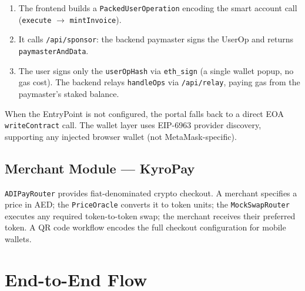 \documentclass[11pt,a4paper]{article}
\begin{document}
\begin{enumerate}[leftmargin=2em, topsep=2pt, itemsep=1pt]
  \item The frontend builds a \texttt{PackedUserOperation} encoding the smart account
    call (\texttt{execute} $\to$ \texttt{mintInvoice}).
  \item It calls \texttt{/api/sponsor}: the backend paymaster signs the UserOp and
    returns \texttt{paymasterAndData}.
  \item The user signs only the \texttt{userOpHash} via \texttt{eth\_sign} (a single
    wallet popup, no gas cost). The backend relays \texttt{handleOps} via
    \texttt{/api/relay}, paying gas from the paymaster's staked balance.
\end{enumerate}

\noindent When the EntryPoint is not configured, the portal falls back to a direct
EOA \texttt{writeContract} call. The wallet layer uses EIP-6963 provider discovery,
supporting any injected browser wallet (not MetaMask-specific).

\subsection{Merchant Module — KyroPay}

\texttt{ADIPayRouter} provides fiat-denominated crypto checkout. A merchant specifies a price
in AED; the \texttt{PriceOracle} converts it to token units; the \texttt{MockSwapRouter}
executes any required token-to-token swap; the merchant receives their preferred token.
A QR code workflow encodes the full checkout configuration for mobile wallets.

\section{End-to-End Flow}
\end{document}

